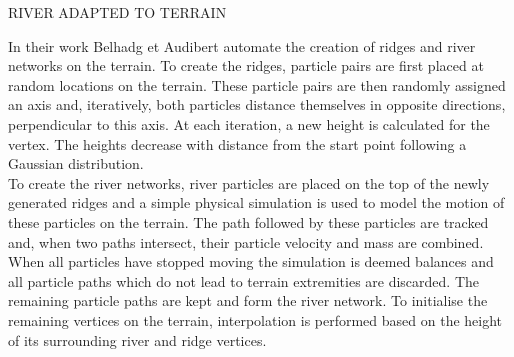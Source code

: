 RIVER ADAPTED TO TERRAIN

In their work Belhadg et Audibert \cite{Belhadj2005} automate the creation of ridges and river networks on the terrain. To create the ridges, particle pairs are first placed at random locations on the terrain. These particle pairs are then randomly assigned an axis and, iteratively, both particles distance themselves in opposite directions, perpendicular to this axis. At each iteration, a new height is calculated for the vertex. The heights decrease with distance from the start point following a Gaussian distribution.\\
To create the river networks, river particles are placed on the top of the newly generated ridges and a simple physical simulation is used to model the motion of these particles on the terrain. The path followed by these particles are tracked and, when two paths intersect, their particle velocity and mass are combined. When all particles have stopped moving the simulation is deemed balances and all particle paths which do not lead to terrain extremities are discarded. The remaining particle paths are kept and form the river network. To initialise the remaining vertices on the terrain, interpolation is performed based on the height of its surrounding river and ridge vertices.


